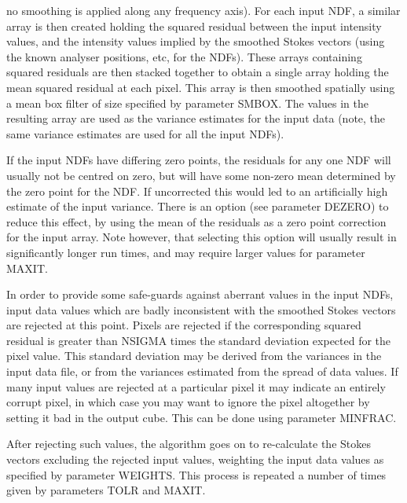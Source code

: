 \documentclass[twoside,11pt]{article}
\renewcommand{\_}{\texttt{\symbol{95}}}
\newcommand{\sstitem}{\item}
\newcommand{\sstitem}{\item}
\begin{document}
{{{         \sstitem
         no smoothing is applied along any frequency axis). For each input
         NDF, a similar array is then created holding the squared residual
         between the input intensity values, and the intensity values implied
         by the smoothed Stokes vectors (using the known analyser positions,
         etc, for the NDFs). These arrays containing squared residuals are
         then stacked together to obtain a single array holding the mean
         squared residual at each pixel. This array is then smoothed spatially
         using a mean box filter of size specified by parameter SMBOX. The
         values in the resulting array are used as the variance estimates for
         the input data (note, the same variance estimates are used for all
         the input NDFs).

      }
      If the input NDFs have differing zero points, the residuals
      for any one NDF will usually not be centred on zero, but will
      have some non-zero mean determined by the zero point for the
      NDF. If uncorrected this would led to an artificially high
      estimate of the input variance. There is an option (see parameter
      DEZERO) to reduce this effect, by using the mean of the residuals
      as a zero point correction for the input array. Note however, that
      selecting this option will usually result in significantly
      longer run times, and may require larger values for parameter
      MAXIT.

      In order to provide some safe-guards against aberrant values in
      the input NDFs, input data values which are badly inconsistent
      with the smoothed Stokes vectors are rejected at this point. Pixels
      are rejected if the corresponding squared residual is greater than
      NSIGMA times the standard deviation expected for the pixel value.
      This standard deviation may be derived from the variances in the
      input data file, or from the variances estimated from the spread
      of data values. If many input values are rejected at a particular
      pixel it may indicate an entirely corrupt pixel, in which case you
      may want to ignore the pixel altogether by setting it bad in the
      output cube. This can be done using parameter MINFRAC.

      After rejecting such values, the algorithm goes on to re-calculate
      the Stokes vectors excluding the rejected input values, weighting
      the input data values as specified by parameter WEIGHTS. This
      process is repeated a number of times given by parameters TOLR
      and MAXIT.

}}
\end{document}
